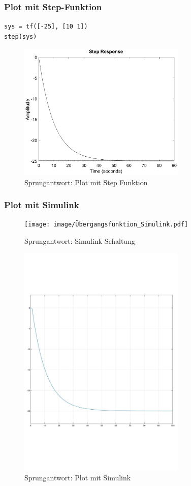 \subsubsection{Plot mit Step-Funktion}
\texttt{sys = tf([-25], [10 1])}\\
\texttt{step(sys)}\\
\begin{figure}[H]
    \centering
    \includegraphics[width=8cm]{image/PlotMitStepFunktion.eps}
    \caption{Sprungantwort: Plot mit Step Funktion}
\end{figure}
\subsubsection{Plot mit Simulink}
\begin{figure}[H]
    \centering
    \texttt{[image: image/Übergangsfunktion\_Simulink.pdf]}
    \caption{Sprungantwort: Simulink Schaltung}
\end{figure}
\begin{figure}[H]
    \centering
    \includegraphics[width=8cm]{image/PlotmitSimulinkSprung.pdf}
    \caption{Sprungantwort: Plot mit Simulink}
\end{figure}